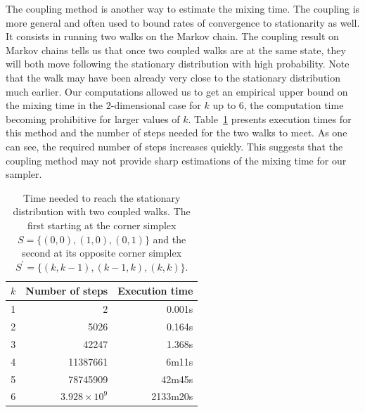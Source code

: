 \documentclass[a4paper]{article}
\begin{document}
The coupling method is another way to estimate the mixing time. The coupling is more general and often used to bound rates of convergence to stationarity as well. It consists in running two walks on the Markov chain.
The coupling result on Markov chains tells us that once two coupled walks are at the same state, they will both move following the stationary distribution with high probability. Note that the walk may have been already very close to the stationary distribution much earlier.
Our computations allowed us to get an empirical upper bound on the  mixing time in the $2$-dimensional case for $k$ up to $6$, the computation time becoming prohibitive for larger values of $k$.
Table~\ref{Tab.Coupling} presents execution times for this method and the number of steps needed for the two walks to meet.
As one can see, the required number of steps increases quickly. This suggests that the coupling method may not provide sharp estimations of the mixing time for our sampler.

\begin{table}[t]
  \centering
  \caption{Time needed to reach the stationary distribution with two coupled walks. The first starting at the corner simplex $S=\{(0,0),(1,0),(0,1)\}$ and the second at its opposite corner simplex $S^\prime=\{(k,k-1),(k-1,k),(k,k)\}$.}
  \label{Tab.Coupling}

  \bigskip

  \begin{tabular}{|c|r|r|}
    \hline
    $k$ & Number of steps & Execution time\\
    \hline
    1 & 2 & 0.001s \\
    2 & 5026 & 0.164s \\
    3 & 42247 & 1.368s \\
    4 & 11387661 & 6m11s \\
    5 & 78745909 & 42m45s \\
    6 & $3.928 \times 10^9$ & 2133m20s \\
    \hline
  \end{tabular}
\end{table}



\end{document}
